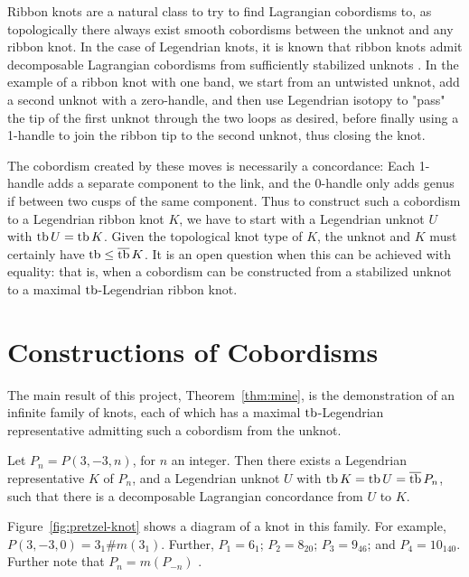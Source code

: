 Ribbon knots are a natural class to try to find Lagrangian cobordisms to, as topologically there always exist smooth cobordisms between the unknot and any ribbon knot.
In the case of Legendrian knots, it is known that ribbon knots admit decomposable Lagrangian cobordisms from sufficiently stabilized unknots \cite{leverson-etnyre}.
In the example of a ribbon knot with one band, we start from an untwisted unknot, add a second unknot with a zero-handle, and then use Legendrian isotopy to "pass" the tip of the first unknot through the two loops as desired, before finally using a 1-handle to join the ribbon tip to the second unknot, thus closing the knot. 

The cobordism created by these moves is necessarily a concordance: Each 1-handle adds a separate component to the link, and the 0-handle only adds genus if between two cusps of the same component.
Thus to construct such a cobordism to a Legendrian ribbon knot $K$, we have to start with a Legendrian unknot $U$ with $\operatorname{tb} U = \operatorname{tb} K$. Given the topological knot type of $K$, the unknot and $K$ must certainly have $\operatorname{tb} \leq \overline{\operatorname{tb}}\, K$.
It is an open question when this can be achieved with equality: that is, when a cobordism can be constructed from a stabilized unknot to a maximal $\operatorname{tb}$-Legendrian ribbon knot.

\section{Constructions of Cobordisms}\label{sec:thm-a-proof}
The main result of this project, Theorem~\ref{thm:mine}, is the demonstration of an infinite family of knots, each of which has a maximal $\operatorname{tb}$-Legendrian representative admitting such a cobordism from the unknot.

\begin{mythm}\label{thm:mine}
    Let $P_n = P(3, -3, n)$, for $n$ an integer. Then there exists a Legendrian representative $K$ of $P_n$, and a Legendrian unknot $U$ with $\operatorname{tb} K = \operatorname{tb} U = \overline{\operatorname{tb}}\, P_n$, such that there is a decomposable Lagrangian concordance from $U$ to $K$.
\end{mythm}

Figure~\ref{fig:pretzel-knot} shows a diagram of a knot in this family.
For example, $P(3, -3, 0) = 3_1 \# m(3_1)$. Further, $P_1 = 6_1$; $P_2 = 8_{20}$; $P_3 = 9_{46}$; and $P_4 = 10_{140}$. Further note that $P_n = m(P_{-n})$ \cite{kawauchi}.

